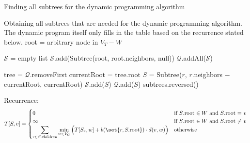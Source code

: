 \documentclass[language=english, number=1]{../lib/homework}
\begin{document}
    \begin{algorithm}
        \caption{Finding all subtrees for the dynamic programming algorithm}
        \label{alg:idk}
        \begin{algorithmic}[1]
            \Statex Obtaining all subtrees that are needed for the dynamic programming algorithm.
            The dynamic program itself only fills in the table based on the recurrence stated below.
                \State root = arbitrary node in $V_T - W$

                \State $\mathcal S$ = empty list
                \State $\mathcal S$.add(Subtree(root, root.neighbors, null)) 
                \State $\mathcal Q$.addAll($\mathcal S$)

                    \State tree = $\mathcal Q$.removeFirst
                    \State currentRoot = tree.root
                        \State $S$ = Subtree($r$, $r$.neighbors $-$ currentRoot, currentRoot)
                        \State $\mathcal S$.add($S$)
                        \State $\mathcal Q$.add($S$)
                    \EndFor
                \EndWhile
                \State \Return subtrees.reversed()
            \EndProcedure
        \end{algorithmic}
    \end{algorithm}

    Recurrence:
    \[
        T[S, v] = \begin{cases}
                      0 &\text{if $S$.root $\in W$ and $S$.root = $v$} \\
                      \infty &\text{if $S$.root $\in W$ and $S$.root $\neq$ $v$} \\
                      \displaystyle \sum_{r \in S.\text{children}} \min_{w \in V_G} \Big( T[S_r, w] + b(\set{r, S.\text{root}}) \cdot d(v, w) \Big) &\text{otherwise} \\
        \end{cases}
    \]
\end{document}
